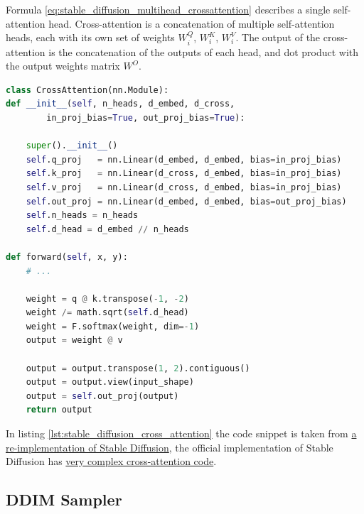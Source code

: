 Formula \ref{eq:stable_diffusion_multihead_crossattention} describes a single self-attention head. Cross-attention is a concatenation of multiple self-attention heads, each with its own set of weights $W_i^Q$, $W_i^K$, $W_i^V$. The output of the cross-attention is the concatenation of the outputs of each head, and dot product with the output weights matrix $W^O$.



\begin{lstlisting}[language=Python, caption={Cross-attention PyTorch code snippet. The '@' operation is a dot product.}, label={lst:stable_diffusion_cross_attention}]
class CrossAttention(nn.Module):
def __init__(self, n_heads, d_embed, d_cross, 
        in_proj_bias=True, out_proj_bias=True):

    super().__init__()
    self.q_proj   = nn.Linear(d_embed, d_embed, bias=in_proj_bias)
    self.k_proj   = nn.Linear(d_cross, d_embed, bias=in_proj_bias)
    self.v_proj   = nn.Linear(d_cross, d_embed, bias=in_proj_bias)
    self.out_proj = nn.Linear(d_embed, d_embed, bias=out_proj_bias)
    self.n_heads = n_heads
    self.d_head = d_embed // n_heads

def forward(self, x, y):
    # ...

    weight = q @ k.transpose(-1, -2)
    weight /= math.sqrt(self.d_head)
    weight = F.softmax(weight, dim=-1)
    output = weight @ v

    output = output.transpose(1, 2).contiguous()
    output = output.view(input_shape)
    output = self.out_proj(output)
    return output
\end{lstlisting}

In listing \ref{lst:stable_diffusion_cross_attention} the code snippet is taken from \href{https://github.com/hkproj/pytorch-stable-diffusion/blob/e0cb06de011787cdf13eed7b4287ad8410491149/sd/attention.py#L100C1-L110C28}{a re-implementation of Stable Diffusion}, the official implementation of Stable Diffusion has \href{https://github.com/CompVis/stable-diffusion/blob/21f890f9da3cfbeaba8e2ac3c425ee9e998d5229/ldm/modules/attention.py#L152}{very complex cross-attention code}.

















\subsection{DDIM Sampler}
\label{subsec:ddim_sampler}

